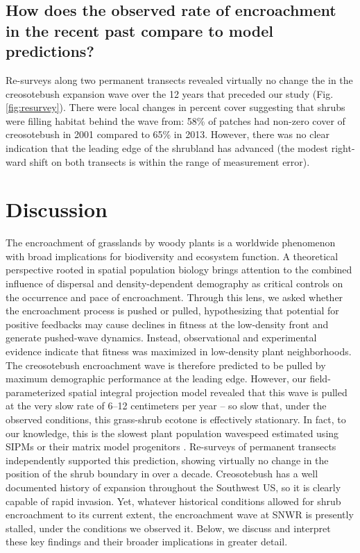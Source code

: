 \documentclass[11pt]{article}\usepackage[]{graphicx}\usepackage[]{color}
\begin{document}
\subsection*{How does the observed rate of encroachment in the recent past compare to model predictions?}
Re-surveys along two permanent transects revealed virtually no change the in the creosotebush expansion wave over the 12 years that preceded our study (Fig. \ref{fig:resurvey}).
There were local changes in percent cover suggesting that shrubs were filling habitat behind the wave from: 58\% of patches had non-zero cover of creosotebush in 2001 compared to 65\% in 2013.
However, there was no clear indication that the leading edge of the shrubland has advanced (the modest right-ward shift on both transects is within the range of measurement error). 

\section*{Discussion}

The encroachment of grasslands by woody plants is a worldwide phenomenon with broad implications for biodiversity and ecosystem function. 
A theoretical perspective rooted in spatial population biology brings attention to the combined influence of dispersal and density-dependent demography as critical controls on the occurrence and pace of encroachment. 
Through this lens, we asked whether the encroachment process is pushed or pulled, hypothesizing that potential for positive feedbacks may cause declines in fitness at the low-density front and generate pushed-wave dynamics. 
Instead, observational and experimental evidence indicate that fitness was maximized in low-density plant neighborhoods.
The creosotebush encroachment wave is therefore predicted to be pulled by maximum demographic performance at the leading edge.
However, our field-parameterized spatial integral projection model revealed that this wave is pulled at the very slow rate of 6--12 centimeters per year -- so slow that, under the observed conditions, this grass-shrub ecotone is effectively stationary. 
In fact, to our knowledge, this is the slowest plant population wavespeed estimated using SIPMs or their matrix model progenitors \citep{neubert2000demography}. 
Re-surveys of permanent transects independently supported this prediction, showing virtually no change in the position of the shrub boundary in over a decade. 
Creosotebush has a well documented history of expansion throughout the Southwest US, so it is clearly capable of rapid invasion.
Yet, whatever historical conditions allowed for shrub encroachment to its current extent, the encroachment wave at SNWR is presently stalled, under the conditions we observed it.
Below, we discuss and interpret these key findings and their broader implications in greater detail. 
\end{document}
